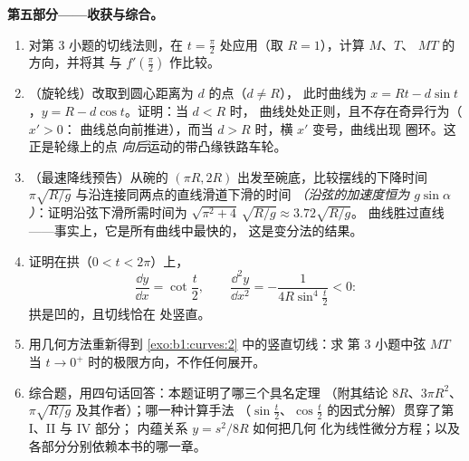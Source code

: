 \begin{problem}
\medskip
\noindent\textbf{第五部分——收获与综合。}
\begin{enumerate}[resume]
  \item 对第 3 小题的切线法则，在 $t =
        \frac\pi2$ 处应用（取 $R = 1$），计算 $M$、$T$、
        $MT$ 的方向，并将其
        与 $f'(\frac\pi2)$ 作比较。
  \item （旋轮线）改取到圆心距离为 $d$ 的点（$d \neq R$），
        此时曲线为 $x = Rt -
        d\sin t$，$y = R - d\cos t$。证明：当 $d < R$ 时，
        曲线处处正则，且不存在奇异行为（$x' > 0$：
        曲线总向前推进），而当 $d
        > R$ 时，横 $x'$ 变号，曲线出现
        圈环。这正是轮缘上的点
        \emph{向后}运动的带凸缘铁路车轮。
  \item （最速降线预告）从碗的 $(\pi R, 2R)$
        出发至碗底，比较摆线的下降时间
        $\pi\sqrt{R/g}$ 与沿连接同两点的直线滑道下滑的时间
        \emph{（沿弦的加速度恒为
        $g\sin\alpha$）}：证明沿弦下滑所需时间为
        $\sqrt{\pi^2 + 4}\,\sqrt{R/g} \approx 3.72\sqrt{R/g}$。
        曲线胜过直线——事实上，它是所有曲线中最快的，
        这是变分法的结果。
  \item 证明在拱（$0 < t < 2\pi$）上，
        \[
        \frac{\dd y}{\dd x} = \cot\frac t2,
        \qquad
        \frac{\dd^2 y}{\dd x^2} =
        -\frac{1}{4R\sin^4\frac t2} < 0 :
        \]
        拱是凹的，且切线恰在
        处竖直。
  \item 用几何方法重新得到
        \cref{exo:b1:curves:2} 中的竖直切线：求
        第 3 小题中弦 $MT$ 当 $t \to
        0^{+}$ 时的极限方向，不作任何展开。
  \item 综合题，用四句话回答：本题证明了哪三个具名定理
        （附其结论 $8R$、$3\pi
        R^2$、$\pi\sqrt{R/g}$ 及其作者）；哪一种计算手法
        （$\sin\frac t2$、$\cos\frac t2$
        的因式分解）贯穿了第 I、II 与 IV 部分；
        内蕴关系 $y = s^2/8R$ 如何把几何
        化为线性微分方程；以及
        各部分分别依赖本书的哪一章。
\end{enumerate}
\end{problem}
